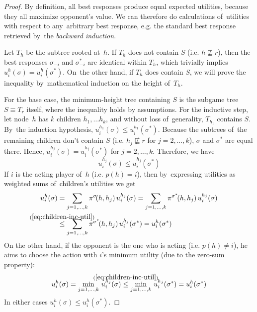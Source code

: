 \begin{proof}
  By definition, all best responses produce equal expected utilities, because they all maximize opponent's value.
  We can therefore do calculations of~utilities with respect to any~arbitrary best response, e.g. the standard best response retrieved by~the \emph{backward induction}\footnotemark.

  Let $T_h$ be the subtree rooted at~$h$.
  If $T_h$ does not contain $S$ (i.e. $h \not\sqsubseteq r$), then the best responses $\sigma_{-i}$ and $\sigma^*_{-i}$ are identical within $T_h$, which trivially implies $u_i^h (\sigma) = u_i^h (\sigma^*)$.
  On~the other hand, if $T_h$ does contain $S$, we will prove the inequality by~mathematical induction on the height of~$T_h$.

  For the base case, the minimum-height tree containing $S$ is the subgame tree $S \equiv T_r$ itself, where the inequality holds by assumptions.
  For the inductive step, let node~$h$ has $k$ children $h_1, \dots h_k$, and without loss of~generality, $T_{h_1}$ contains $S$.
  By~the induction hypothesis, $u_i^{h_1} (\sigma) \le u_i^{h_1} (\sigma^*)$.
  Because the subtrees of~the remaining children don't contain $S$ (i.e. $h_j \not\sqsubseteq r$ for $j = 2, \dots, k$), $\sigma$ and $\sigma^*$ are equal there.
  Hence, $u_i^{h_j} (\sigma) = u_i^{h_j} (\sigma^*)$ for $j = 2, \dots, k$.
  Therefore, we have
  \begin{equation}
    \label{eq:children-inc-util}
    u_i^{h_j}(\sigma) \le u_i^{h_j}(\sigma^*)
  \end{equation}
  If $i$ is the acting player of~$h$ (i.e. $p(h) = i$), then by~expressing utilities as weighted sums of~children's utilities we get
  \begin{align*}
    u_i^h(\sigma)
    &= \sum _{j = 1, \dots, k} \pi^\sigma\!(h,h_j) \,u_i^{h_j}(\sigma)
    = \sum _{j = 1, \dots, k} \pi^{\sigma^*}\!(h,h_j) \,u_i^{h_j}(\sigma) \\
    &\stackrel{\mathclap{\mathrm{(\ref{eq:children-inc-util})}}} {\le}
    \sum _{j = 1, \dots, k} \pi^{\sigma^*}\!(h,h_j) \,u_i^{h_j}(\sigma^*)
    = u_i^h(\sigma^*)
  \end{align*}
  On the other hand, if the opponent is the one who is acting (i.e. $p(h) \ne i$), he aims to choose the action with $i$'s minimum utility (due to the zero-sum property):
  \begin{align*}
    u_i^h(\sigma)
    = \min _{j = 1, \dots, k} \,u_i^{h_j}(\sigma)
    \stackrel{\mathclap{\mathrm{(\ref{eq:children-inc-util})}}} {\le}
    \min _{j = 1, \dots, k} \,u_i^{h_j}(\sigma^*)
    = u_i^h(\sigma^*)
  \end{align*}
  In either cases $u_i^h(\sigma) \le u_i^h(\sigma^*)$.
\end{proof}

